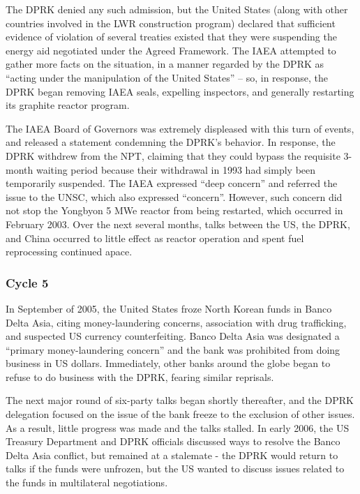 \documentclass{article}
\begin{document}
The DPRK denied any such admission, but the United States (along with other countries involved in the LWR construction program) declared that sufficient evidence of violation of several treaties existed that they were suspending the energy aid negotiated under the Agreed Framework\cite{iaea09}. The IAEA attempted to gather more facts on the situation, in a manner regarded by the DPRK as “acting under the manipulation of the United States”\cite{hurriyet} – so, in response, the DPRK began removing IAEA seals, expelling inspectors, and generally restarting its graphite reactor program\cite{iaea09}.

The IAEA Board of Governors was extremely displeased with this turn of events, and released a statement condemning the DPRK’s behavior\cite{iaea03}. In response, the DPRK withdrew from the NPT, claiming that they could bypass the requisite 3-month waiting period because their withdrawal in 1993 had simply been temporarily suspended\cite{kcna4}. The IAEA expressed “deep concern” and referred the issue to the UNSC, which also expressed “concern”\cite{iaea09}. However, such concern did not stop the Yongbyon 5 MWe reactor from being restarted, which occurred in February 2003\cite{davenport}. Over the next several months, talks between the US, the DPRK, and China occurred to little effect as reactor operation and spent fuel reprocessing continued apace\cite{davenport}.

\subsubsection{Cycle 5}
In September of 2005, the United States froze North Korean funds in Banco Delta Asia, citing money-laundering concerns, association with drug trafficking, and suspected US currency counterfeiting\cite{davenport}. Banco Delta Asia was designated a “primary money-laundering concern” and the bank was prohibited from doing business in US dollars. Immediately, other banks around the globe began to refuse to do business with the DPRK, fearing similar reprisals\cite{greenlees}.

The next major round of six-party talks began shortly thereafter, and the DPRK delegation focused on the issue of the bank freeze to the exclusion of other issues\cite{greenlees}. As a result, little progress was made and the talks stalled. In early 2006, the US Treasury Department and DPRK officials discussed ways to resolve the Banco Delta Asia conflict, but remained at a stalemate - the DPRK would return to talks if the funds were unfrozen, but the US wanted to discuss issues related to the funds in multilateral negotiations\cite{greenlees}.
\end{document}
